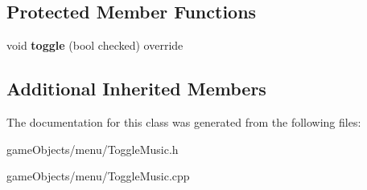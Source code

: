 \subsection*{Protected Member Functions}
\begin{DoxyCompactItemize}
\item 
\hypertarget{class_toggle_music_a0bc62ef2c749ad30960ac483bc047241}{void {\bfseries toggle} (bool checked) override}\label{class_toggle_music_a0bc62ef2c749ad30960ac483bc047241}

\end{DoxyCompactItemize}
\subsection*{Additional Inherited Members}


The documentation for this class was generated from the following files\+:\begin{DoxyCompactItemize}
\item 
game\+Objects/menu/Toggle\+Music.\+h\item 
game\+Objects/menu/Toggle\+Music.\+cpp\end{DoxyCompactItemize}

